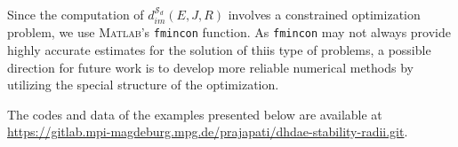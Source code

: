 \documentclass[11pt]{article}
\newcommand{\R}{\mathbb R}
\begin{document}
Since the computation of $d_{im}^{\mathcal S_d}(E,J,R)$ involves a constrained optimization problem, we use \textsc{Matlab}’s \texttt{fmincon} function. As \texttt{fmincon} may not always provide highly accurate estimates for the solution of thiis type of problems, a possible direction for future work is to develop more reliable numerical methods by utilizing the special structure of the optimization.

The codes and data of the examples presented below are available at \url{https://gitlab.mpi-magdeburg.mpg.de/prajapati/dhdae-stability-radii.git}.



\end{document}
